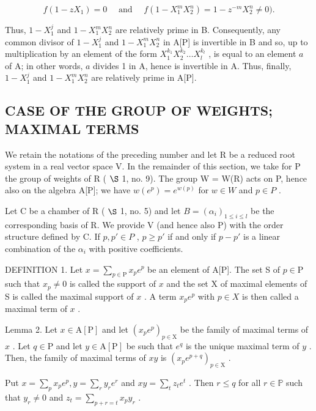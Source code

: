 \[
f (1 - z X _ {1}) = 0 \quad \text { and } \quad f (1 - X _ {1} ^ {m} X _ {2} ^ {n}) = 1 - z ^ {- m} X _ {2} ^ {n} \neq 0).
\]

Thus, \(1 - X_1^j\) and \(1 - X_1^m X_2^n\) are relatively prime in B. Consequently, any common divisor of \(1 - X_1^j\) and \(1 - X_1^m X_2^n\) in A{[}P{]} is invertible in B and so, up to multiplication by an element of the form \(X_1^{k_1}X_2^{k_2}\ldots X_l^{k_l}\) , is equal to an element \(a\) of A; in other words, \(a\) divides 1 in A, hence is invertible in A. Thus, finally, \(1 - X_1^j\) and \(1 - X_1^m X_2^n\) are relatively prime in A{[}P{]}.

\subsection{CASE OF THE GROUP OF WEIGHTS; MAXIMAL TERMS}

We retain the notations of the preceding number and let R be a reduced root system in a real vector space V. In the remainder of this section, we take for P the group of weights of R ( \(\S\) 1, no. 9). The group W = W(R) acts on P, hence also on the algebra A{[}P{]}; we have \(w(e^{p}) = e^{w(p)}\) for \(w \in W\) and \(p \in P\) .

Let C be a chamber of R ( \(\S\) 1, no. 5) and let \(B = (\alpha_{i})_{1 \leqslant i \leqslant l}\) be the corresponding basis of R. We provide V (and hence also P) with the order structure defined by C. If \(p, p' \in P\) , \(p \geqslant p'\) if and only if \(p - p'\) is a linear combination of the \(\alpha_{i}\) with positive coefficients.

DEFINITION 1. Let \(x = \sum_{p \in \mathrm{P}} x_p e^p\) be an element of A{[}P{]}. The set S of \(p \in \mathrm{P}\) such that \(x_p \neq 0\) is called the support of \(x\) and the set X of maximal elements of S is called the maximal support of \(x\) . A term \(x_p e^p\) with \(p \in X\) is then called a maximal term of \(x\) .

Lemma 2. Let \(x \in \mathrm{A}[\mathrm{P}]\) and let \((x_{p}e^{p})_{p \in \mathrm{X}}\) be the family of maximal terms of \(x\) . Let \(q \in \mathrm{P}\) and let \(y \in \mathrm{A}[\mathrm{P}]\) be such that \(e^{q}\) is the unique maximal term of \(y\) . Then, the family of maximal terms of \(xy\) is \((x_{p}e^{p + q})_{p \in \mathrm{X}}\) .

Put \(x = \sum_{p} x_{p} e^{p}, y = \sum_{r} y_{r} e^{r}\) and \(xy = \sum_{t} z_{t} e^{t}\) . Then \(r \leqslant q\) for all \(r \in \mathbb{P}\) such that \(y_{r} \neq 0\) and \(z_{t} = \sum_{p + r = t} x_{p} y_{r}\) .

